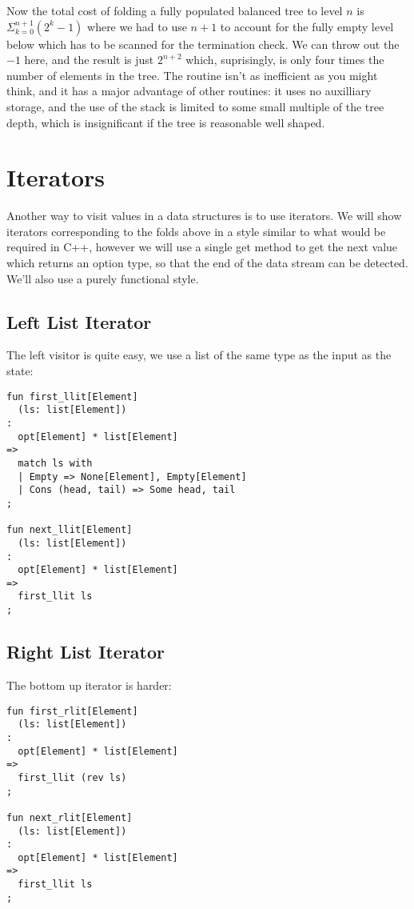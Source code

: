 \documentclass[oneside]{book}
\begin{document}
Now the total cost of folding a fully populated balanced tree to level $n$
is $\Sigma_{k=0}^{n+1} (2^k-1)$ where we had to use $n+1$ to account for the
fully empty level below which has to be scanned for the termination check.
We can throw out the $-1$ here, and the result is just $2^{n+2}$ which,
suprisingly, is only four times the number of elements in the tree. 
The routine isn't as inefficient as you might think, and it has
a major advantage of other routines: it uses no auxilliary storage,
and the use of the stack is limited to some small multiple of the
tree depth, which is insignificant if the tree is reasonable well
shaped.


\section{Iterators}
Another way to visit values in a data structures is to use iterators.
We will show iterators corresponding to the folds above in a style
similar to what would be required in C++, however we will use a single
get method to get the next value which returns an option type, so
that the end of the data stream can be detected. We'll also use a purely
functional style.

\subsection{Left List Iterator}
The left visitor is quite easy, we use a list of the same type
as the input as the state:

\begin{verbatim}
fun first_llit[Element] 
  (ls: list[Element])
:
  opt[Element] * list[Element] 
=> 
  match ls with
  | Empty => None[Element], Empty[Element]
  | Cons (head, tail) => Some head, tail
;

fun next_llit[Element] 
  (ls: list[Element]) 
:
  opt[Element] * list[Element] 
=> 
  first_llit ls
;
\end{verbatim}


\subsection{Right List Iterator}
The bottom up iterator is harder:

\begin{verbatim}
fun first_rlit[Element] 
  (ls: list[Element]) 
:
  opt[Element] * list[Element] 
=> 
  first_llit (rev ls)
;

fun next_rlit[Element] 
  (ls: list[Element]) 
:
  opt[Element] * list[Element] 
=> 
  first_llit ls
;
\end{verbatim}
\end{document}

